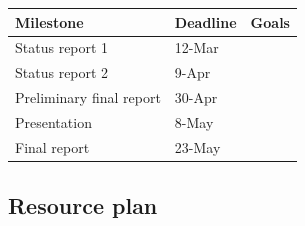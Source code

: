 \documentclass{article}
\begin{document}
		\begin{center}	
			\bigskip
			\begin{tabular}{|C{3cm}|C{3cm}|C{8.5cm}|}
				Milestone & Deadline & Goals \\ \hline
				Status report 1 & 12-Mar & \\ \hline
				Status report 2 & 9-Apr & \\ \hline
				Preliminary final report & 30-Apr & \\ \hline
				Presentation & 8-May & \\ \hline
				Final report & 23-May & \\ \hline
			\end{tabular}
		\end{center}	
	\subsection{Resource plan}
\end{document}
